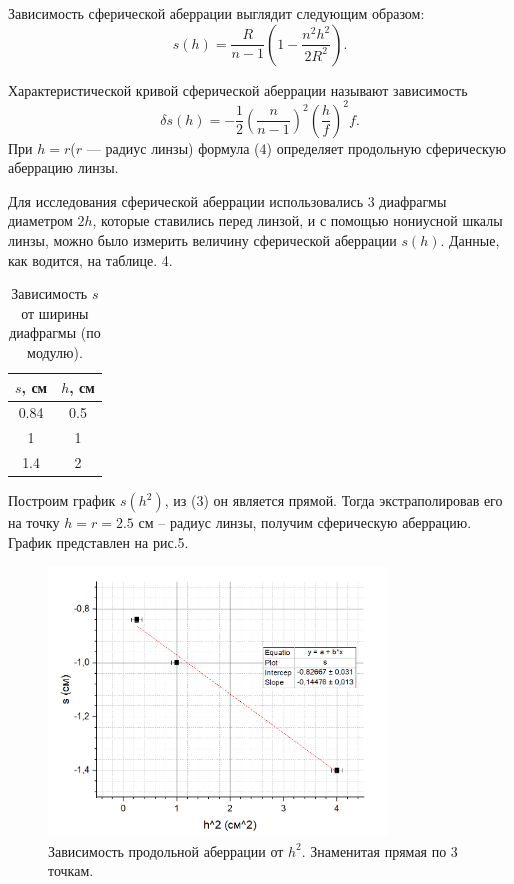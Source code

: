 \documentclass[a4paper, 14pt]{extarticle}%
\newcommand\ECaption[1]{%
     \captionsetup{font=footnotesize}%
     \caption{#1}}
\begin{document}
Зависимость сферической аберрации выглядит следующим образом:
\begin{equation}
s(h) = \frac{R}{n-1}\left( 1- \frac{n^2h^2}{2R^2}\right) .
\end{equation}

Характеристической кривой сферической аберрации называют зависимость
\begin{equation}
\delta s(h) = -\frac{1}{2}\left( \frac{n}{n-1}\right)^2\left( \frac{h}{f}\right)^2 f.
\end{equation}
При $ h = r $($r$ — радиус линзы) формула (4) определяет продольную
сферическую аберрацию линзы.

Для исследования сферической аберрации использовались 3 диафрагмы диаметром $2h$, которые ставились перед линзой, и с помощью нониусной шкалы линзы, можно было измерить величину сферической аберрации $s(h)$. Данные, как водится, на таблице. 4.

\begin{table}[h!]
\begin{center}
\begin{tabular}{|c|c|}
\hline
\rowcolor[HTML]{9698ED} 
$s$, см & $h$, см \\ \hline
0.84    & 0.5     \\ \hline
\rowcolor[HTML]{9698ED} 
1       & 1       \\ \hline
1.4     & 2       \\ \hline
\end{tabular}
\ECaption{Зависимость $s$ от ширины диафрагмы (по модулю).}
\end{center}
\end{table}

Построим график $s(h^2)$, из (3) он является прямой. Тогда экстраполировав его на точку $h = r =2.5$ см -- радиус линзы, получим сферическую аберрацию. График представлен на рис.5.

\begin{figure}[h!]
\begin{center}
\includegraphics[width=0.8\textwidth]{gr2}
\end{center}
\ECaption{Зависимость продольной аберрации от $h^2$. Знаменитая прямая по 3 точкам. }
\end{figure}
\end{document}
